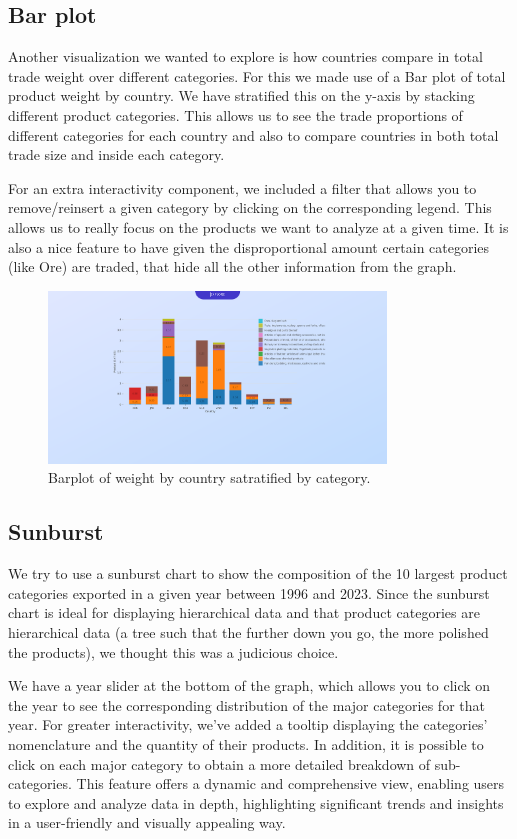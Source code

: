 \documentclass[12pt,a4]{article}
\begin{document}
\subsection{Bar plot}
Another visualization we wanted to explore is how countries compare in total trade weight over different categories. For this we made use of a Bar plot of total product weight by country. We have stratified this on the y-axis by stacking different product categories. This allows us to see the trade proportions of different categories for each country and also to compare countries in both total trade size and inside each category.

For an extra interactivity component, we included a filter that allows you to remove/reinsert a given category by clicking on the corresponding legend. This allows us to really focus on the products we want to analyze at a given time. It is also a nice feature to have given the disproportional amount certain categories (like Ore) are traded, that hide all the other information from the graph.


\begin{figure}[H]
    \centering
    \includegraphics[width=0.8\textwidth]{barplot.png}
    \caption{Barplot of weight by country satratified by category.}
\end{figure}

\subsection{Sunburst}
We try to use a sunburst chart to show the composition of the 10 largest product categories exported in a given year between 1996 and 2023. Since the sunburst chart is ideal for displaying hierarchical data and that product categories are hierarchical data (a tree such 
that the further down you go, the more polished the products), we thought this was a judicious choice.

We have a year slider at the bottom of the graph, which allows you to click on the year to see the corresponding distribution of the major categories for that year. For greater interactivity, we've added a tooltip displaying the categories' nomenclature and the quantity of their products. In addition, it is possible to click on each major category to obtain a more detailed breakdown of sub-categories. This feature offers a dynamic and comprehensive view, enabling users to explore and analyze data in depth, highlighting significant trends and insights in a user-friendly and visually appealing way.
\end{document}

